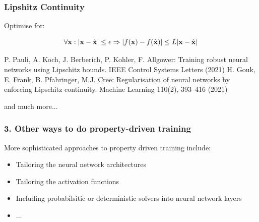 \documentclass[aspectratio=169]{beamer}
\newcommand{\distance}[2]{|#1 - #2|}
\newcommand{\xs}{\x} 			%
\begin{document}
    \begin{frame}
      \frametitle{ Lipshitz Continuity}

      Optimise for:

  \begin{equation*}
    \label{eq:lipschitz-robustness}
    \forall \xs: \distance{\xs}{\xt} \leq \epsilon \Rightarrow \distance{f(\xs)}{f(\xt)} \leq L \distance{\xs}{\xt}
  \end{equation*}

   {\scriptsize
   \begin{thebibliography}{99}
        \beamertemplatearticlebibitems
P. Pauli, A. Koch, J. Berberich, P. Kohler, F. Allgower: Training robust neural networks
using Lipschitz bounds. IEEE Control Systems Letters (2021)
 H. Gouk, E. Frank, B. Pfahringer, M.J. Cree: Regularisation of neural networks by enforcing Lipschitz continuity. Machine Learning 110(2), 393–416 (2021)
\end{thebibliography}}


and much more...

    \end{frame}


 \begin{frame}
      \frametitle{3. Other ways to do property-driven training}

\begin{block}{More sophisticated approaches to property driven training include:}
\begin{itemize}
\item Tailoring the neural network architectures

\item Tailoring the activation functions

\item Including probabilsitic or deterministic solvers into neural network layers

\item $\ldots$
\end{itemize}
\end{block}

  {\scriptsize
 \begin{thebibliography}{99}
   \beamertemplatearticlebibitems
\end{thebibliography}}



\end{frame}
\end{document}
